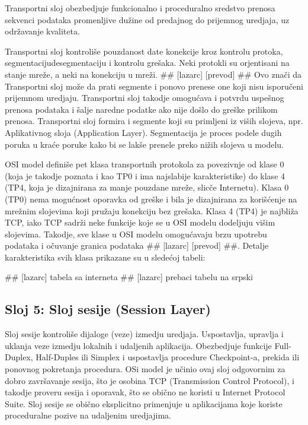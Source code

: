 \documentclass[a4paper,12pt, master]{etf}
\begin{document}
	Transportni sloj obezbedjuje funkcionalno i proceduralno sredstvo prenosa sekvenci podataka
	promenljive du\v{z}ine od predajnog do prijemnog uredjaja, uz odr\v{z}avanje kvaliteta.

	Transportni sloj kontroli\v{s}e pouzdanost date konekcije kroz kontrolu protoka,
	segmentaciju\/desegmentaciju i kontrolu gre\v{s}aka. Neki protokli su orjentisani na stanje 
	mre\v{z}e, a neki na konekciju u mre\v{z}i. \#\# [lazarc] [prevod] \#\# Ovo zna\v{c}i da Transportni 
	sloj mo\v{z}e da prati segmente i ponovo prenese one koji nisu isporu\v{c}eni prijemnom uredjaju. 
	Transportni sloj takodje omogu\'{c}ava i potvrdu uspe\v{s}nog prenosa podataka i \v{s}alje naredne 
	podatke ako nije do\v{s}lo do gre\v{s}ke prilikom prenosa. Transportni sloj formira i segmente 
	koji su primljeni iz vi\v{s}ih slojeva, npr. Aplikativnog sloja (Application Layer). 
	Segmentacija je proces podele dugih poruka u kra\'{c}e poruke kako bi se lak\v{s}e prenele preko 
	ni\v{z}ih slojeva u modelu.

	OSI model defini\v{s}e pet klasa transportnih protokola za povezivnje od klase 0 (koja je 
	takodje poznata i kao TP0 i ima najslabije karakteristike) do klase 4 (TP4, koja je 
	dizajnirana za manje pouzdane mre\v{z}e, slic\v{c}e Internetu). Klasa 0 (TP0) nema mogu\'{c}nost 
	oporavka od gre\v{s}ke i bila je dizajnirana za kori\v{s}\'{c}enje na mre\v{z}nim slojevima koji pru\v{z}aju 
	konekciju bez gre\v{s}aka. Klasa 4 (TP4) je najbli\v{z}a TCP, iako TCP sadr\v{z}i neke funkcije koje 
	se u OSI modelu dodeljuju vi\v{s}im slojevima. Takodje, sve klase u OSI modelu omogu\'{c}avaju 
	brzu upotrebu podataka i o\v{c}uvanje granica podataka \#\# [lazarc] [prevod] \#\#. Detalje 
	karakteristika svih klasa prikazane su u slede\'{c}oj tabeli:

	\#\# [lazarc] tabela sa interneta
	\#\# [lazarc] prebaci tabelu na srpski

	\subsection{Sloj 5: Sloj sesije (Session Layer)}

	Sloj sesije kontroli\v{s}e dijaloge (veze) izmedju uredjaja. Uspostavlja, upravlja i uklanja 
	veze izmedju lokalnih i udaljenih aplikacija. Obezbedjuje funkcije Full-Duplex, 
	Half-Duples ili	Simplex i uspostavlja procedure Checkpoint-a, prekida ili ponovnog 
	pokretanja procedura. OSi model je u\v{c}inio ovaj sloj odgovornim za dobro zavr\v{s}avanje sesija,
	\v{s}to je osobina TCP (Transmission Control Protocol), i takodje proveru sesija i oporavak, 
	\v{s}to se obi\v{c}no ne koristi u Internet Protocol Suite. Sloj sesije se obi\v{c}no eksplicitno 
	primenjuje u aplikacijama koje koriste proceduralne pozive na udaljenim uredjajima.
\end{document}
